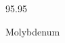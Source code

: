 \documentclass[12pt]{article}
\begin{document}
\hfill{}
\vfill
\begin{center}
  {\fontsize{50}{60}
  }

  \vspace{1em}

  95.95

Molybdenum
\end{center}
\vfill
\end{document}
